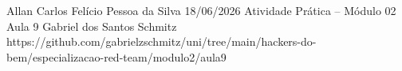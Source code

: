 \documentclass{article}
\begin{document}
{Allan Carlos Felício Pessoa da Silva}
{18/06/2026}
{Atividade Prática -- Módulo 02}
{Aula 9}
{Gabriel dos Santos Schmitz}
{https://github.com/gabrielzschmitz/uni/tree/main/hackers-do-bem/especializacao-red-team/modulo2/aula9}





\newpage
\printbibliography[title=Referências]
\end{document}
